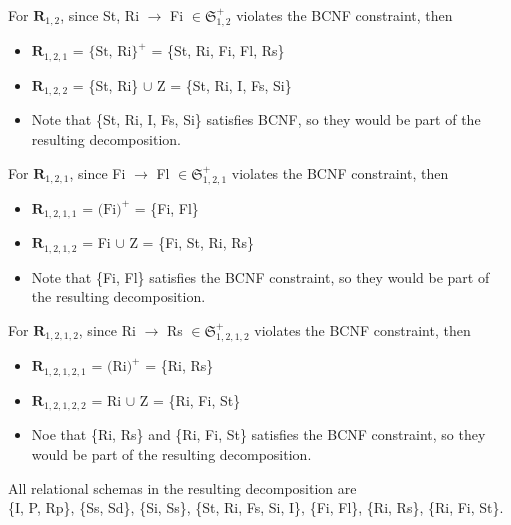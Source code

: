 \documentclass[12pt]{article}
\begin{document}
\begin{enumerate}
        For $\textbf{R}_{1,2}$, since St, Ri $\longrightarrow$ Fi $\in
        \mathfrak{S}_{1,2}^+$ violates the BCNF constraint, then
        \begin{itemize}
          \item $\textbf{R}_{1,2,1}$ = $\text{\{St, Ri\}}^+$
                                     = \{St, Ri, Fi, Fl, Rs\}
          \item $\textbf{R}_{1,2,2}$ = \{St, Ri\} $\cup$ Z
                                     = \{St, Ri, I, Fs, Si\}
          \item Note that \{St, Ri, I, Fs, Si\} satisfies BCNF, so they would be
                part of the resulting decomposition.
        \end{itemize}

        For $\textbf{R}_{1,2,1}$, since Fi $\longrightarrow$ Fl $\in
        \mathfrak{S}_{1,2,1}^+$ violates the BCNF constraint, then
        \begin{itemize}
          \item $\textbf{R}_{1,2,1,1}$ = $\text{(Fi)}^+$
                                       = \{Fi, Fl\}
          \item $\textbf{R}_{1,2,1,2}$ = Fi $\cup$ Z
                                       = \{Fi, St, Ri, Rs\}
          \item Note that \{Fi, Fl\} satisfies the BCNF constraint, so they
                would be part of the resulting decomposition.
        \end{itemize}

        For $\textbf{R}_{1,2,1,2}$, since Ri $\longrightarrow$ Rs $\in
        \mathfrak{S}_{1,2,1,2}^+$ violates the BCNF constraint, then
        \begin{itemize}
          \item $\textbf{R}_{1,2,1,2,1}$ = $\text{(Ri)}^+$
                                         = \{Ri, Rs\}
          \item $\textbf{R}_{1,2,1,2,2}$ = Ri $\cup$ Z
                                         = \{Ri, Fi, St\}
          \item Noe that \{Ri, Rs\} and \{Ri, Fi, St\} satisfies the BCNF
                constraint, so they would be part of the resulting
                decomposition.
        \end{itemize}

        All relational schemas in the resulting decomposition are \\
        \{I, P, Rp\}, \{Ss, Sd\}, \{Si, Ss\}, \{St, Ri, Fs, Si, I\}, \{Fi, Fl\},
        \{Ri, Rs\}, \{Ri, Fi, St\}. \\


\end{enumerate}
\end{document}
